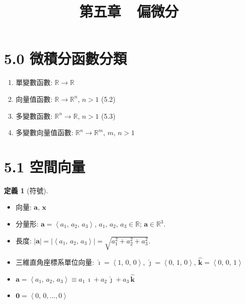 \documentclass[12pt]{extarticle}
\newcommand{\llt}{\left\langle}
\newcommand{\rgt}{\right\rangle}
\theoremstyle{definition}
\newtheorem*{dfn}{定義}
\newcommand{\va}{\mathbf{a}}
\newcommand{\vx}{\mathbf{x}}
\newcommand{\vZero}{\mathbf{0}}
\newcommand{\hi}{\widehat{\pmb{\imath}}}
\newcommand{\hj}{\widehat{\pmb{\jmath}}}
\newcommand{\hk}{\widehat{\mathbf{k}}}
\begin{document}
\title{\texorpdfstring{\vspace{-16mm} 第五章\ \ 偏微分}{第五章\ \ 偏微分}} 
\author{\vspace{-5em}}
\date{\vspace{-5em}}
\maketitle
\thispagestyle{firststyle}

\section*{5.0 微積分函數分類}
\setlength{\columnsep}{-20mm}
\begin{multicols}{2}
  \begin{enumerate}\setlength{\itemsep}{0pt}
    \item 單變數函數: $\mathbb{R}\to\mathbb{R}$
    \item 向量值函數: $\mathbb{R}\to\mathbb{R}^n$, $n > 1$ (5.2)
    \item 多變數函數: $\mathbb{R}^n\to\mathbb{R}$, $n > 1$ (5.3)
    \item 多變數向量值函數: $\mathbb{R}^n\to\mathbb{R}^m$, $m$, $n > 1$
  \end{enumerate}
\end{multicols}

\section*{5.1 空間向量}

\begin{dfn}[符號]
  \setlength{\columnsep}{10mm}
  \begin{multicols}{2}
    \begin{itemize}\setlength{\itemsep}{0pt}
      \item 向量: $\va$, $\vx$
      \item 分量形: $\va = \llt a_1,\,a_2,\,a_3\rgt$, $a_1$, $a_2$, $a_3\in\mathbb{R}$; $\va\in\mathbb{R}^3$. 
      \item 長度: $|\va| = |\llt a_1,\,a_2,\,a_3 \rgt| = \sqrt{a_1^2 + a_2^2 + a_3^2}$. 
      \item 三維直角座標系單位向量: $\hi = \llt 1,\,0,\,0\rgt$, $\hj = \llt 0,\,1,\,0\rgt$, $\hk = \llt 0,\,0,\,1\rgt$
      \item $\va = \llt a_1,\,a_2,\,a_3\rgt \equiv a_1\,\hi + a_2\,\hj + a_3\,\hk$
      \item $\vZero = \llt 0,\,0,\ldots,0\rgt$
    \end{itemize}
  \end{multicols}
\end{dfn}
\end{document}
